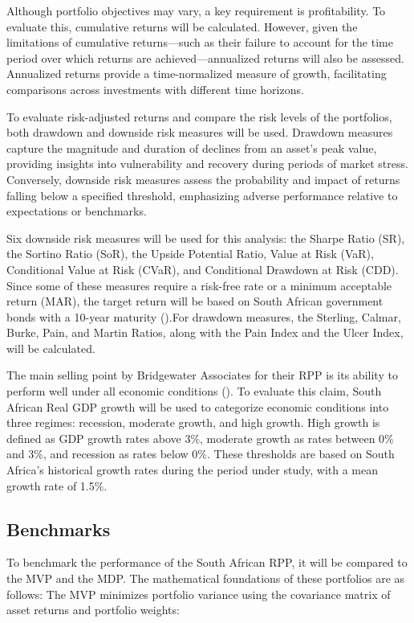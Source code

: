 \documentclass[11pt,preprint]{elsarticle}
\numberwithin{equation}{section}
\numberwithin{figure}{section}
\numberwithin{table}{section}
\begin{document}
Although portfolio objectives may vary, a key requirement is
profitability. To evaluate this, cumulative returns will be calculated.
However, given the limitations of cumulative returns---such as their
failure to account for the time period over which returns are
achieved---annualized returns will also be assessed. Annualized returns
provide a time-normalized measure of growth, facilitating comparisons
across investments with different time horizons.

To evaluate risk-adjusted returns and compare the risk levels of the
portfolios, both drawdown and downside risk measures will be used.
Drawdown measures capture the magnitude and duration of declines from an
asset's peak value, providing insights into vulnerability and recovery
during periods of market stress. Conversely, downside risk measures
assess the probability and impact of returns falling below a specified
threshold, emphasizing adverse performance relative to expectations or
benchmarks.

Six downside risk measures will be used for this analysis: the Sharpe
Ratio (SR), the Sortino Ratio (SoR), the Upside Potential Ratio, Value
at Risk (VaR), Conditional Value at Risk (CVaR), and Conditional
Drawdown at Risk (CDD). Since some of these measures require a risk-free
rate or a minimum acceptable return (MAR), the target return will be
based on South African government bonds with a 10-year maturity
().For drawdown
measures, the Sterling, Calmar, Burke, Pain, and Martin Ratios, along
with the Pain Index and the Ulcer Index, will be calculated.

The main selling point by Bridgewater Associates for their RPP is its
ability to perform well under all economic conditions
(). To evaluate this claim, South
African Real GDP growth will be used to categorize economic conditions
into three regimes: recession, moderate growth, and high growth. High
growth is defined as GDP growth rates above 3\%, moderate growth as
rates between 0\% and 3\%, and recession as rates below 0\%. These
thresholds are based on South Africa's historical growth rates during
the period under study, with a mean growth rate of 1.5\%.

\subsection{Benchmarks}\label{benchmarks}

To benchmark the performance of the South African RPP, it will be
compared to the MVP and the MDP. The mathematical foundations of these
portfolios are as follows: The MVP minimizes portfolio variance using
the covariance matrix of asset returns and portfolio weights:
\end{document}
